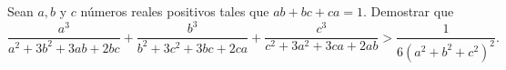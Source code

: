Sean $a, b$ y $c$ números reales positivos tales que $a b+b c+c a=1$. Demostrar que
\[
\frac{a^{3}}{a^{2}+3 b^{2}+3 a b+2 b c}+\frac{b^{3}}{b^{2}+3 c^{2}+3 b c+2 c a}+\frac{c^{3}}{c^{2}+3 a^{2}+3 c a+2 a b}>\frac{1}{6\left(a^{2}+b^{2}+c^{2}\right)^{2}} .\]